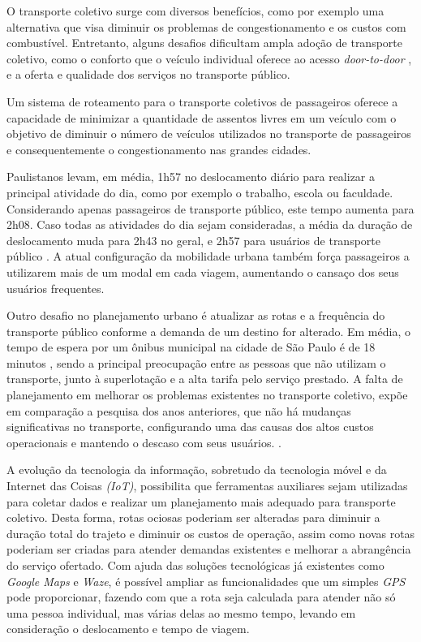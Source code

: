 O transporte coletivo surge com diversos benefícios, como por exemplo uma alternativa que visa diminuir os problemas de congestionamento e os custos com combustível. Entretanto, alguns desafios dificultam ampla adoção de transporte coletivo, como o conforto que o veículo individual oferece ao acesso \emph{door-to-door} \cite{FURUHATA201328}, e a oferta e qualidade dos serviços no transporte público.

Um sistema de roteamento para o transporte coletivos de passageiros oferece a capacidade de minimizar a quantidade de assentos livres em um veículo com o objetivo de diminuir o número de veículos utilizados no transporte de passageiros e consequentemente o congestionamento nas grandes cidades. \cite{MOURAD2019323}

Paulistanos levam, em média, 1h57 no deslocamento diário para realizar a principal atividade do dia, como por exemplo o trabalho, escola ou faculdade. Considerando apenas passageiros de transporte público, este tempo aumenta para 2h08. Caso todas as atividades do dia sejam consideradas, a média da duração de deslocamento muda para 2h43 no geral, e 2h57 para usuários de transporte público \cite{viveremsp}. A atual configuração da mobilidade urbana também força passageiros a utilizarem mais de um modal em cada viagem, aumentando o cansaço dos seus usuários frequentes.

Outro desafio no planejamento urbano é atualizar as rotas e a frequência do transporte público conforme a demanda de um destino for alterado. Em média, o tempo de espera por um ônibus municipal na cidade de São Paulo é de 18 minutos \cite{viveremsp}, sendo a principal preocupação entre as pessoas que não utilizam o transporte, junto à superlotação e a alta tarifa pelo serviço prestado. A falta de planejamento em melhorar os problemas existentes no transporte coletivo, expõe em comparação a pesquisa dos anos anteriores, que não há mudanças significativas no transporte, configurando uma das causas dos altos custos operacionais e mantendo o descaso com seus usuários. \cite{viveremsp}.

A evolução da tecnologia da informação, sobretudo da tecnologia móvel e da Internet das Coisas \emph{(IoT)}, possibilita que ferramentas auxiliares sejam utilizadas para coletar dados e realizar um planejamento mais adequado para transporte coletivo. Desta forma, rotas ociosas poderiam ser alteradas para diminuir a duração total do trajeto e diminuir os custos de operação, assim como novas rotas poderiam ser criadas para atender demandas existentes e melhorar a abrangência do serviço ofertado. Com ajuda das soluções tecnológicas já existentes como \emph{Google Maps} e \emph{Waze}, é possível ampliar as funcionalidades que um simples \emph{GPS} pode proporcionar, fazendo com que a rota seja calculada para atender não só uma pessoa individual, mas várias delas ao mesmo tempo, levando em consideração o deslocamento e tempo de viagem.

